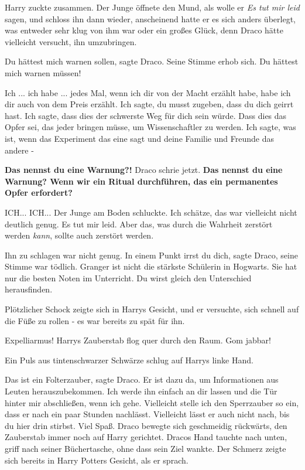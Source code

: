 Harry zuckte zusammen. Der Junge öffnete den Mund, als wolle er \emph{ \glqq Es
tut mir leid\grqq{} } sagen, und schloss ihn dann wieder, anscheinend hatte er
es sich anders überlegt, was entweder sehr klug von ihm war oder ein großes
Glück, denn Draco hätte vielleicht versucht, ihn umzubringen.

\glqq Du hättest mich warnen sollen\grqq{}, sagte Draco. Seine Stimme erhob
sich. \glqq Du hättest mich warnen müssen!\grqq{}

\glqq Ich ... ich habe ... jedes Mal, wenn ich dir von der Macht erzählt habe,
habe ich dir auch von dem Preis erzählt. Ich sagte, du musst zugeben, dass du
dich geirrt hast. Ich sagte, dass dies der schwerste Weg für dich sein würde.
Dass dies das Opfer sei, das jeder bringen müsse, um Wissenschaftler zu werden.
Ich sagte, was ist, wenn das Experiment das eine sagt und deine Familie und
Freunde das andere -\grqq{}

\glqq \textbf{Das nennst du eine Warnung?!}\grqq{} Draco schrie jetzt. \textbf{
\glqq Das nennst du eine Warnung? Wenn wir ein Ritual durchführen, das ein
permanentes Opfer erfordert?\grqq{} }

\glqq ICH... ICH...\grqq{} Der Junge am Boden schluckte. \glqq Ich schätze, das
war vielleicht nicht deutlich genug. Es tut mir leid. Aber das, was durch die
Wahrheit zerstört werden \emph{kann}, sollte auch zerstört werden.\grqq{}

Ihn zu schlagen war nicht genug. \glqq In einem Punkt irrst du dich\grqq{},
sagte Draco, seine Stimme war tödlich. \glqq Granger ist nicht die stärkste
Schülerin in Hogwarts. Sie hat nur die besten Noten im Unterricht. Du wirst
gleich den Unterschied herausfinden.\grqq{}

Plötzlicher Schock zeigte sich in Harrys Gesicht, und er versuchte, sich schnell
auf die Füße zu rollen - es war bereits zu spät für ihn.

\glqq Expelliarmus!\grqq{} Harrys Zauberstab flog quer durch den Raum. \glqq Gom
jabbar!\grqq{}

Ein Puls aus tintenschwarzer Schwärze schlug auf Harrys linke Hand.

\glqq Das ist ein Folterzauber\grqq{}, sagte Draco. \glqq Er ist dazu da, um
Informationen aus Leuten herauszubekommen. Ich werde ihn einfach an dir lassen
und die Tür hinter mir abschließen, wenn ich gehe. Vielleicht stelle ich den
Sperrzauber so ein, dass er nach ein paar Stunden nachlässt. Vielleicht lässt er
auch nicht nach, bis du hier drin stirbst. Viel Spaß.\grqq{} Draco bewegte sich
geschmeidig rückwärts, den Zauberstab immer noch auf Harry gerichtet. Dracos
Hand tauchte nach unten, griff nach seiner Büchertasche, ohne dass sein Ziel
wankte. Der Schmerz zeigte sich bereits in Harry Potters Gesicht, als er sprach.

